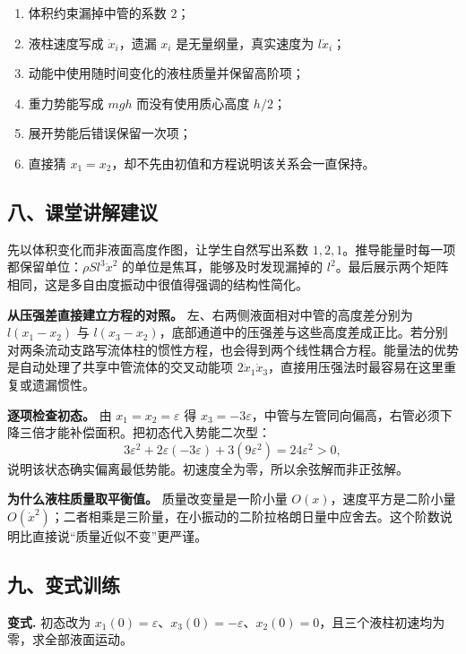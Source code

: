 \documentclass[12pt,a4paper,UTF8]{ctexart}
\newcommand{\tightlist}{\setlength{\itemsep}{0pt}\setlength{\parskip}{0pt}}
\begin{document}
\begin{enumerate}
\def\labelenumi{\arabic{enumi}.}
\tightlist
\item
  体积约束漏掉中管的系数 \(2\)；
\item
  液柱速度写成 \(\dot x_i\)，遗漏 \(x_i\) 是无量纲量，真实速度为
  \(l\dot x_i\)；
\item
  动能中使用随时间变化的液柱质量并保留高阶项；
\item
  重力势能写成 \(mgh\) 而没有使用质心高度 \(h/2\)；
\item
  展开势能后错误保留一次项；
\item
  直接猜 \(x_1=x_2\)，却不先由初值和方程说明该关系会一直保持。
\end{enumerate}

\subsection{八、课堂讲解建议}\label{ux516bux8bfeux5802ux8bb2ux89e3ux5efaux8bae-4}

先以体积变化而非液面高度作图，让学生自然写出系数
\(1,2,1\)。推导能量时每一项都保留单位：\(\rho Sl^3\dot x^2\)
的单位是焦耳，能够及时发现漏掉的
\(l^2\)。最后展示两个矩阵相同，这是多自由度振动中很值得强调的结构性简化。

\textbf{从压强差直接建立方程的对照。}
左、右两侧液面相对中管的高度差分别为 \(l(x_1-x_2)\) 与
\(l(x_3-x_2)\)，底部通道中的压强差与这些高度差成正比。若分别对两条流动支路写流体柱的惯性方程，也会得到两个线性耦合方程。能量法的优势是自动处理了共享中管流体的交叉动能项
\(2\dot x_1\dot x_3\)，直接用压强法时最容易在这里重复或遗漏惯性。

\textbf{逐项检查初态。} 由 \(x_1=x_2=\varepsilon\) 得
\(x_3=-3\varepsilon\)，中管与左管同向偏高，右管必须下降三倍才能补偿面积。把初态代入势能二次型：
\[
3\varepsilon^2+2\varepsilon(-3\varepsilon)
+3(9\varepsilon^2)=24\varepsilon^2>0,
\] 说明该状态确实偏离最低势能。初速度全为零，所以余弦解而非正弦解。

\textbf{为什么液柱质量取平衡值。} 质量改变量是一阶小量
\(O(x)\)，速度平方是二阶小量
\(O(\dot x^2)\)；二者相乘是三阶量，在小振动的二阶拉格朗日量中应舍去。这个阶数说明比直接说``质量近似不变''更严谨。

\subsection{九、变式训练}\label{ux4e5dux53d8ux5f0fux8badux7ec3-4}

\textbf{变式.} 初态改为
\(x_1(0)=\varepsilon\)、\(x_3(0)=-\varepsilon\)、\(x_2(0)=0\)，且三个液柱初速均为零，求全部液面运动。
\end{document}
